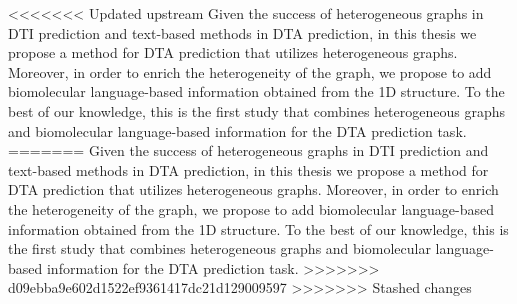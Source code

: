 <<<<<<< Updated upstream
Given the success of heterogeneous graphs in DTI prediction and text-based methods in DTA prediction, in this thesis we propose a method for DTA prediction that utilizes heterogeneous graphs. Moreover, in order to enrich the heterogeneity of the graph, we propose to add biomolecular language-based information obtained from the 1D structure. To the best of our knowledge, this is the first study that combines heterogeneous graphs and biomolecular language-based information for the DTA prediction task. 
=======
Given the success of heterogeneous graphs in DTI prediction and text-based methods in DTA prediction, in this thesis we propose a method for DTA prediction that utilizes heterogeneous graphs. Moreover, in order to enrich the heterogeneity of the graph, we propose to add biomolecular language-based information obtained from the 1D structure. To the best of our knowledge, this is the first study that combines heterogeneous graphs and biomolecular language-based information for the DTA prediction task. 
>>>>>>> d09ebba9e602d1522ef9361417dc21d129009597
>>>>>>> Stashed changes
